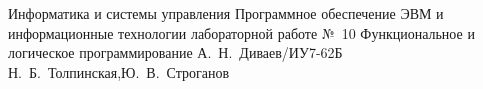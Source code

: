 \documentclass[a4paper,oneside,14pt]{extarticle}
\begin{document}
\makereporttitle
    {Информатика и системы управления} %
    {Программное обеспечение ЭВМ и информационные технологии} %
    {лабораторной работе №~10} %
    {Функциональное и логическое программирование} %
    {} %
    {} %
    {А.~Н.~Диваев/ИУ7-62Б} %
    {Н.~Б.~Толпинская,Ю.~В.~Строганов} %

\setcounter{page}{2}





\end{document}

